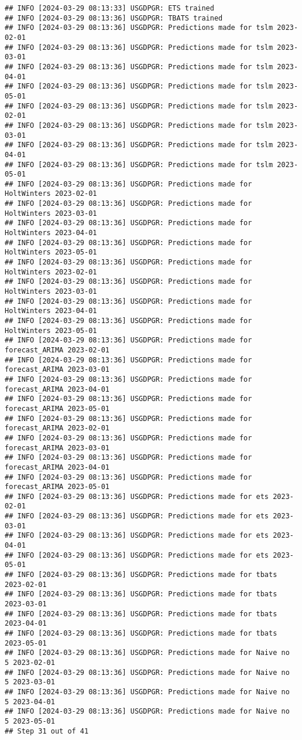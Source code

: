 \documentclass[
]{article}
\begin{document}
\begin{verbatim}
## INFO [2024-03-29 08:13:33] USGDPGR: ETS trained
## INFO [2024-03-29 08:13:36] USGDPGR: TBATS trained
## INFO [2024-03-29 08:13:36] USGDPGR: Predictions made for tslm 2023-02-01
## INFO [2024-03-29 08:13:36] USGDPGR: Predictions made for tslm 2023-03-01
## INFO [2024-03-29 08:13:36] USGDPGR: Predictions made for tslm 2023-04-01
## INFO [2024-03-29 08:13:36] USGDPGR: Predictions made for tslm 2023-05-01
## INFO [2024-03-29 08:13:36] USGDPGR: Predictions made for tslm 2023-02-01
## INFO [2024-03-29 08:13:36] USGDPGR: Predictions made for tslm 2023-03-01
## INFO [2024-03-29 08:13:36] USGDPGR: Predictions made for tslm 2023-04-01
## INFO [2024-03-29 08:13:36] USGDPGR: Predictions made for tslm 2023-05-01
## INFO [2024-03-29 08:13:36] USGDPGR: Predictions made for HoltWinters 2023-02-01
## INFO [2024-03-29 08:13:36] USGDPGR: Predictions made for HoltWinters 2023-03-01
## INFO [2024-03-29 08:13:36] USGDPGR: Predictions made for HoltWinters 2023-04-01
## INFO [2024-03-29 08:13:36] USGDPGR: Predictions made for HoltWinters 2023-05-01
## INFO [2024-03-29 08:13:36] USGDPGR: Predictions made for HoltWinters 2023-02-01
## INFO [2024-03-29 08:13:36] USGDPGR: Predictions made for HoltWinters 2023-03-01
## INFO [2024-03-29 08:13:36] USGDPGR: Predictions made for HoltWinters 2023-04-01
## INFO [2024-03-29 08:13:36] USGDPGR: Predictions made for HoltWinters 2023-05-01
## INFO [2024-03-29 08:13:36] USGDPGR: Predictions made for forecast_ARIMA 2023-02-01
## INFO [2024-03-29 08:13:36] USGDPGR: Predictions made for forecast_ARIMA 2023-03-01
## INFO [2024-03-29 08:13:36] USGDPGR: Predictions made for forecast_ARIMA 2023-04-01
## INFO [2024-03-29 08:13:36] USGDPGR: Predictions made for forecast_ARIMA 2023-05-01
## INFO [2024-03-29 08:13:36] USGDPGR: Predictions made for forecast_ARIMA 2023-02-01
## INFO [2024-03-29 08:13:36] USGDPGR: Predictions made for forecast_ARIMA 2023-03-01
## INFO [2024-03-29 08:13:36] USGDPGR: Predictions made for forecast_ARIMA 2023-04-01
## INFO [2024-03-29 08:13:36] USGDPGR: Predictions made for forecast_ARIMA 2023-05-01
## INFO [2024-03-29 08:13:36] USGDPGR: Predictions made for ets 2023-02-01
## INFO [2024-03-29 08:13:36] USGDPGR: Predictions made for ets 2023-03-01
## INFO [2024-03-29 08:13:36] USGDPGR: Predictions made for ets 2023-04-01
## INFO [2024-03-29 08:13:36] USGDPGR: Predictions made for ets 2023-05-01
## INFO [2024-03-29 08:13:36] USGDPGR: Predictions made for tbats 2023-02-01
## INFO [2024-03-29 08:13:36] USGDPGR: Predictions made for tbats 2023-03-01
## INFO [2024-03-29 08:13:36] USGDPGR: Predictions made for tbats 2023-04-01
## INFO [2024-03-29 08:13:36] USGDPGR: Predictions made for tbats 2023-05-01
## INFO [2024-03-29 08:13:36] USGDPGR: Predictions made for Naive no  5 2023-02-01
## INFO [2024-03-29 08:13:36] USGDPGR: Predictions made for Naive no  5 2023-03-01
## INFO [2024-03-29 08:13:36] USGDPGR: Predictions made for Naive no  5 2023-04-01
## INFO [2024-03-29 08:13:36] USGDPGR: Predictions made for Naive no  5 2023-05-01
## Step 31 out of 41
\end{verbatim}
\end{document}
